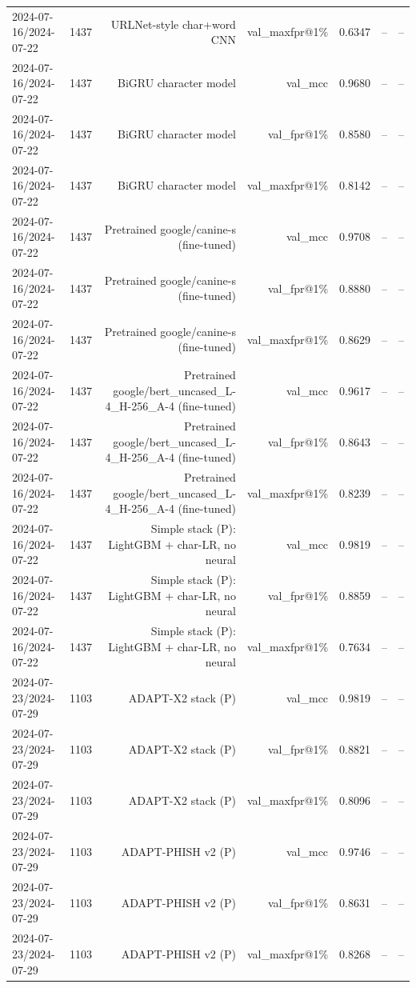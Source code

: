 \begin{table}[t]
\begin{tabular}{llrrrrr}
2024-07-16/2024-07-22 & 1437 & URLNet-style char+word CNN & val\_maxfpr@1\% & 0.6347 & -- & -- \\
2024-07-16/2024-07-22 & 1437 & BiGRU character model & val\_mcc & 0.9680 & -- & -- \\
2024-07-16/2024-07-22 & 1437 & BiGRU character model & val\_fpr@1\% & 0.8580 & -- & -- \\
2024-07-16/2024-07-22 & 1437 & BiGRU character model & val\_maxfpr@1\% & 0.8142 & -- & -- \\
2024-07-16/2024-07-22 & 1437 & Pretrained google/canine-s (fine-tuned) & val\_mcc & 0.9708 & -- & -- \\
2024-07-16/2024-07-22 & 1437 & Pretrained google/canine-s (fine-tuned) & val\_fpr@1\% & 0.8880 & -- & -- \\
2024-07-16/2024-07-22 & 1437 & Pretrained google/canine-s (fine-tuned) & val\_maxfpr@1\% & 0.8629 & -- & -- \\
2024-07-16/2024-07-22 & 1437 & Pretrained google/bert\_uncased\_L-4\_H-256\_A-4 (fine-tuned) & val\_mcc & 0.9617 & -- & -- \\
2024-07-16/2024-07-22 & 1437 & Pretrained google/bert\_uncased\_L-4\_H-256\_A-4 (fine-tuned) & val\_fpr@1\% & 0.8643 & -- & -- \\
2024-07-16/2024-07-22 & 1437 & Pretrained google/bert\_uncased\_L-4\_H-256\_A-4 (fine-tuned) & val\_maxfpr@1\% & 0.8239 & -- & -- \\
2024-07-16/2024-07-22 & 1437 & Simple stack (P): LightGBM + char-LR, no neural & val\_mcc & 0.9819 & -- & -- \\
2024-07-16/2024-07-22 & 1437 & Simple stack (P): LightGBM + char-LR, no neural & val\_fpr@1\% & 0.8859 & -- & -- \\
2024-07-16/2024-07-22 & 1437 & Simple stack (P): LightGBM + char-LR, no neural & val\_maxfpr@1\% & 0.7634 & -- & -- \\
2024-07-23/2024-07-29 & 1103 & ADAPT-X2 stack (P) & val\_mcc & 0.9819 & -- & -- \\
2024-07-23/2024-07-29 & 1103 & ADAPT-X2 stack (P) & val\_fpr@1\% & 0.8821 & -- & -- \\
2024-07-23/2024-07-29 & 1103 & ADAPT-X2 stack (P) & val\_maxfpr@1\% & 0.8096 & -- & -- \\
2024-07-23/2024-07-29 & 1103 & ADAPT-PHISH v2 (P) & val\_mcc & 0.9746 & -- & -- \\
2024-07-23/2024-07-29 & 1103 & ADAPT-PHISH v2 (P) & val\_fpr@1\% & 0.8631 & -- & -- \\
2024-07-23/2024-07-29 & 1103 & ADAPT-PHISH v2 (P) & val\_maxfpr@1\% & 0.8268 & -- & -- \\

\end{tabular}
\end{table}

